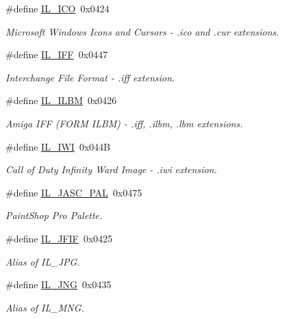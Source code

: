 \begin{DoxyCompactItemize}
\#define \hyperlink{group__il__formats_ga96a36b5af19520c4e176e3c2706420ae}{I\+L\+\_\+\+I\+C\+O}~0x0424
\begin{DoxyCompactList}\small\item\em Microsoft Windows Icons and Cursors -\/ .ico and .cur extensions. \end{DoxyCompactList}\item 
\#define \hyperlink{group__il__formats_ga24e25a541ecc79265ec876702a42cc8c}{I\+L\+\_\+\+I\+F\+F}~0x0447
\begin{DoxyCompactList}\small\item\em Interchange File Format -\/ .iff extension. \end{DoxyCompactList}\item 
\#define \hyperlink{group__il__formats_gad519dac007bd705c82194d808f4b37c1}{I\+L\+\_\+\+I\+L\+B\+M}~0x0426
\begin{DoxyCompactList}\small\item\em Amiga I\+F\+F (F\+O\+R\+M I\+L\+B\+M) -\/ .iff, .ilbm, .lbm extensions. \end{DoxyCompactList}\item 
\#define \hyperlink{group__il__formats_ga1024c13c5d848c827bc70998d4559b36}{I\+L\+\_\+\+I\+W\+I}~0x044\+B
\begin{DoxyCompactList}\small\item\em Call of Duty Infinity Ward Image -\/ .iwi extension. \end{DoxyCompactList}\item 
\#define \hyperlink{group__il__formats_ga45aea262f25a3a0e5445c4d114e1851e}{I\+L\+\_\+\+J\+A\+S\+C\+\_\+\+P\+A\+L}~0x0475
\begin{DoxyCompactList}\small\item\em Paint\+Shop Pro Palette. \end{DoxyCompactList}\item 
\#define \hyperlink{group__il__formats_gadf6c33e1002ea979ef9831d6558ed037}{I\+L\+\_\+\+J\+F\+I\+F}~0x0425
\begin{DoxyCompactList}\small\item\em Alias of I\+L\+\_\+\+J\+P\+G. \end{DoxyCompactList}\item 
\#define \hyperlink{group__il__formats_gaa60a248768ceee17e2ad6b8eda870587}{I\+L\+\_\+\+J\+N\+G}~0x0435
\begin{DoxyCompactList}\small\item\em Alias of I\+L\+\_\+\+M\+N\+G. \end{DoxyCompactList}\item 

\end{DoxyCompactItemize}
